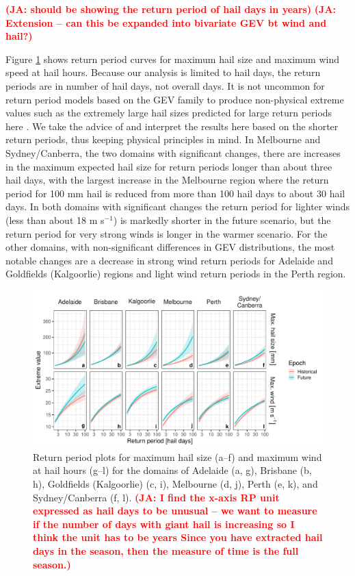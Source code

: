 \documentclass[]{agujournal2019}\usepackage[]{graphicx}\usepackage[]{xcolor}
\newcommand*{\todo}[1]{\textbf{\textcolor{red}{(#1)}}}
\begin{document}
\todo{JA: should be showing the return period of hail days in years}
\todo{JA: Extension – can this be expanded into bivariate GEV bt wind and hail?}

Figure \ref{fig:return_periods_probs_hail} shows return period curves for
maximum hail size and maximum wind speed at hail hours. Because our analysis is
limited to hail days, the return periods are in number of hail days, not overall
days. It is not uncommon for return period models based on the GEV family to
produce non-physical extreme values such as the extremely large hail sizes
predicted for large return periods here \cite[p. 66]{Coles_2001}. We take the
advice of  and interpret the results here based on the shorter
return periods, thus keeping physical principles in mind. In Melbourne and
Sydney/Canberra, the two domains with significant changes, there are increases
in the maximum expected hail size for return periods longer than about three
hail days, with the largest increase in the Melbourne region where the return
period for 100 mm hail is reduced from more than 100 hail days to about 30 hail
days. In both domains with significant changes the return period for lighter
winds (less than about 18 m s$^{-1}$) is markedly shorter in the future
scenario, but the return period for very strong winds is longer in the warmer
scenario. For the other domains, with non-significant differences in GEV
distributions, the most notable changes are a decrease in strong wind return
periods for Adelaide and Goldfields (Kalgoorlie) regions and light wind return
periods in the Perth region.

\begin{figure}[!ht]
      \includegraphics[width=\textwidth]{figures/return_periods}
      \caption{Return period plots for maximum hail size (a--f) and maximum wind
      at hail hours (g--l) for the domains of Adelaide (a, g), Brisbane (b, h),
      Goldfields (Kalgoorlie) (c, i), Melbourne (d, j), Perth (e, k), and
      Sydney/Canberra (f, l). \todo{JA: I find the x-axis RP unit expressed as
      hail days to be unusual – we want to measure if the number of days with
      giant hail is increasing so I think the unit has to be years Since you
      have extracted hail days in the season, then the measure of time is the
      full season.}}
      \label{fig:return_periods_probs_hail}
\end{figure}
\end{document}

